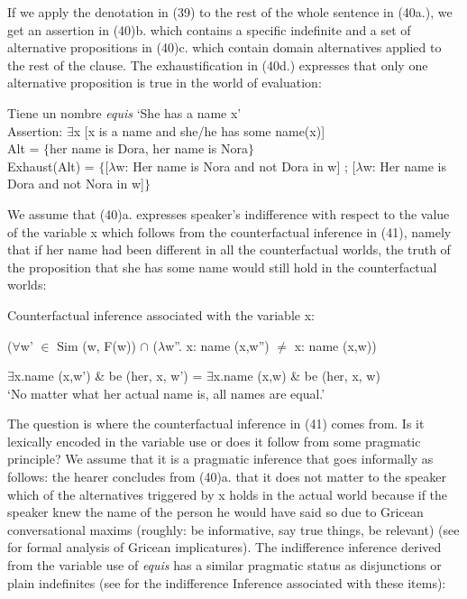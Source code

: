 \documentclass[output=paper
,modfonts
,nonflat]{langsci/langscibook}
\begin{document}
If we apply the denotation in (39) to the rest of the whole sentence in (40a.), we get an assertion in (40)b. which contains a specific indefinite and a set of alternative propositions in (40)c. which contain domain alternatives applied to the rest of the clause. The exhaustification in (40d.) expresses that only one alternative proposition is true in the world of evaluation:

\ea
\begin{xlist}
\ex Tiene un nombre \textit{equis}  ‘She has a name x’\\
\ex Assertion: $\exists$x [x is a name and she/he has some name(x)]\\
\ex Alt = $\lbrace$her name is Dora, her name is Nora$\rbrace$\\
\ex Exhaust(Alt) = $\lbrace${[}$\lambda$w: Her name is Nora and not Dora in w{]} ; {[}$\lambda$w: Her name is Dora and not Nora in w{]}$\rbrace$\\
\end{xlist}
\z

We assume that (40)a. expresses speaker's indifference with respect to the value of the variable x which follows from the counterfactual inference in (41), namely that if her name had been different in all the counterfactual worlds, the truth of the proposition that she has some name would still hold in the counterfactual worlds:

\ea
Counterfactual inference associated with the variable x:\par
($\forall$w’ $\in$ Sim (w, F(w)) $\cap$ ($\lambda$w”. x: name (x,w”) $≠$ x: name (x,w)) \par
$\exists$x.name (x,w’) \& be (her, x, w’) = $\exists$x.name (x,w) \& be (her, x, w)\\
\glt ‘No matter what her actual name is, all names are equal.’
\z

The question is where the counterfactual inference in (41) comes from. Is it lexically encoded in the variable use or does it follow from some pragmatic principle? We assume that it is a pragmatic inference that goes informally as follows: the hearer concludes from (40)a. that it does not matter to the speaker which of the alternatives triggered by x holds in the actual world because if the speaker knew the name of the person he would have said so due to Gricean conversational maxims (roughly: be informative, say true things, be relevant) (see \citealt{Aloni2005} for formal analysis of Gricean implicatures). The indifference inference derived from the variable use of \textit{equis} has a similar pragmatic status as disjunctions or plain indefinites (see \citealt{Aloni2005} for the indifference Inference associated with these items):
\end{document}
